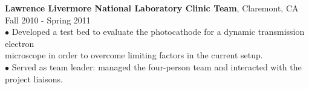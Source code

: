 \documentclass[10pt]{article}
\begin{document}

\newpage


{\bf Lawrence Livermore National Laboratory Clinic Team}, Claremont, CA \hfill Fall 2010 - Spring 2011\\
\hspace*{10pt}$\bullet$ Developed a test bed to evaluate the photocathode for a dynamic transmission electron \\ \hspace*{15pt} microscope in order to overcome limiting factors in the current setup.\\
\hspace*{10pt}$\bullet$ Served as team leader: managed the four-person team and interacted with the project liaisons.\\


\end{document}
